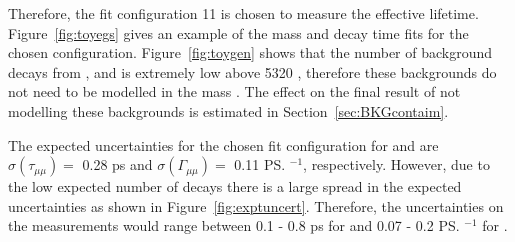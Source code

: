 Therefore, the fit configuration 11 is chosen to measure the \bsmumu effective lifetime. Figure~\ref{fig:toyegs} gives an example of the mass and decay time fits for the chosen configuration. Figure~\ref{fig:toygen} shows that the number of background decays from \bdmumu, \bhh and \lambdab is extremely low above 5320 \mevcc, therefore these backgrounds do not need to be modelled in the mass \pdf. The effect on the final result of not modelling these backgrounds is estimated in Section~\ref{sec:BKGcontaim}.


The expected uncertainties for the chosen fit configuration for \tmumu and \Gmumu are $\sigma \left ( \tau_{\mu\mu}  \right ) = $ 0.28 ps and  $\sigma \left ( \Gamma_{\mu\mu}  \right ) = $ 0.11 \ps$^{-1}$, respectively. However, due to the low expected number of decays there is a large spread in the expected uncertainties as shown in Figure~\ref{fig:exptuncert}. Therefore, the uncertainties on the measurements would range between 0.1 - 0.8 ps for \tmumu and 0.07 - 0.2 \ps$^{-1}$ for \Gmumu.

